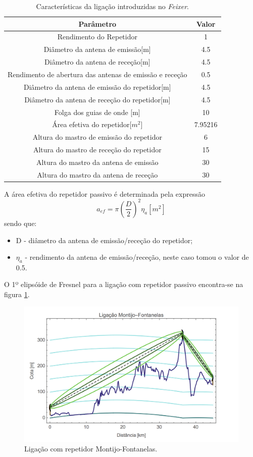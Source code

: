 \begin{table}[H]
\centering
\begin{tabular}{|c|c|}
\hline
Parâmetro & Valor\\
\hline
Rendimento do Repetidor & 1\\
Diâmetro da antena de emissão[m] & 4.5\\
Diâmetro da antena de receção[m] & 4.5\\
Rendimento de abertura das antenas de emissão e receção & 0.5\\
Diâmetro da antena de emissão do repetidor[m] & 4.5\\
Diâmetro da antena de receção do repetidor[m] & 4.5\\
Folga dos guias de onde [m] & 10 \\
Área efetiva do repetidor[$m^2$] & 7.95216\\
Altura do mastro de emissão do repetidor & 6\\
Altura do mastro de receção do repetidor & 15\\
Altura do mastro da antena de emissão & 30\\
Altura do mastro da antena de receção & 30\\
\hline
\end{tabular}
\caption{Características da ligação introduzidas no \textit{Feixer}.}
\end{table}
A área efetiva do repetidor passivo é determinada pela expressão 
\begin{equation}
a_{ef}=\pi(\frac{D}{2})^2\eta_{a} [m^2]
\end{equation}
sendo que:
\begin{itemize}
\item D -  diâmetro da antena de emissão/receção do repetidor;
\item $\eta_{a}$ - rendimento da antena de emissão/receção, neste caso tomou o valor de 0.5.
\end{itemize}
O 1º elipsóide de Fresnel para a ligação com repetidor passivo encontra-se na figura \ref{ligacaoComRep}.
\begin{figure}[H]
\includegraphics[scale=0.5]{elipsoide_f.png}
\centering
\caption{Ligação com repetidor Montijo-Fontanelas.}
\label{ligacaoComRep}
\end{figure}

